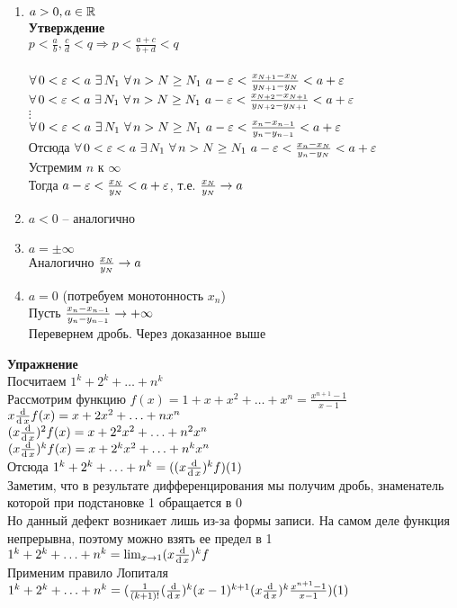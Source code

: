 \documentclass[12pt]{article}
\begin{document}
\begin{enumerate}
    \item $a > 0, a \in \mathbb{R}$\\
    \textbf{Утверждение}\\
    $p < \frac ab,\frac cd < q \Rightarrow p < \frac{a + c}{b + d} < q$\\\\
    $\forall\, 0 < \varepsilon < a\ \exists\, N_1\ \forall\, n > N \geq N_1\ a-\varepsilon < \frac{x_{N+1} - x_N}{y_{N+1} - y_N} < a + \varepsilon$\\
    $\forall\, 0 < \varepsilon < a\ \exists\, N_1\ \forall\, n > N \geq N_1\ a-\varepsilon < \frac{x_{N+2} - x_{N+1}}{y_{N+2} - y_{N+1}} < a + \varepsilon$\\
    $\vdots$\\
    $\forall\, 0 < \varepsilon < a\ \exists\, N_1\ \forall\, n > N \geq N_1\ a-\varepsilon < \frac{x_n - x_{n-1}}{y_n - y_{n-1}} < a + \varepsilon$\\
    Отсюда $\fall 0 < \eps < a\ \ex N_1\ \fall n > N \geq N_1\ a-\eps < \frac{x_n - x_N}{y_n - y_N} < a + \eps$\\
    Устремим $n$ к $\infty$\\
    Тогда $a-\varepsilon < \frac{x_N}{y_N} < a + \varepsilon$, т.е. $\frac{x_N}{y_N} \rightarrow a$
    \item $a < 0$ -- аналогично
    \item $a = \pm\infty$\\
    Аналогично $\frac{x_N}{y_N} \rightarrow a$
    \item $a = 0$ (потребуем монотонность $x_n$)\\
    Пусть $\frac{x_n-x_{n-1}}{y_n-y_{n-1}} \rightarrow +\infty$\\
    Перевернем дробь. Через доказанное выше
\end{enumerate}
\textbf{Упражнение}\\
Посчитаем $1^k + 2^k + \ldots + n^k$\\
Рассмотрим функцию $f(x) = 1 + x + x^2 + \ldots + x^n = \frac{x^{n+1}-1}{x-1}$\\
$x\frac{\operatorname{d}}{\operatorname{d} x} f(x) = x + 2x^2 + \ldots + nx^n$\\
$(x\frac{\operatorname{d}}{\operatorname{d} x})^2 f(x) = x + 2^2x^2 + \ldots + n^2x^n$\\
$(x\frac{\operatorname{d}}{\operatorname{d} x})^k f(x) = x + 2^kx^2 + \ldots + n^kx^n$\\
Отсюда $1^k + 2^k + \ldots + n^k = ((x\frac{\operatorname{d}}{\operatorname{d} x})^k f)(1)$\\
Заметим, что в результате дифференцирования мы получим дробь, знаменатель которой при подстановке 1 обращается в 0\\
Но данный дефект возникает лишь из-за формы записи. На самом деле функция непрерывна, поэтому можно взять ее предел в 1\\
$1^k + 2^k + \ldots + n^k = \lim_{x \rightarrow 1} (x\frac{\operatorname{d}}{\operatorname{d} x})^k f$\\
Применим правило Лопиталя\\
$1^k + 2^k + \ldots + n^k = (\frac1{(k+1)!}(\frac{\operatorname{d}}{\operatorname{d} x})^k (x-1)^{k+1}(x\frac{\operatorname{d}}{\operatorname{d} x})^k \frac{x^{n+1}-1}{x-1}) (1)$
\end{document}
